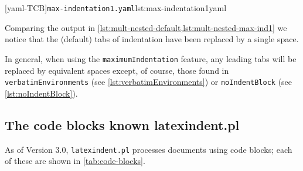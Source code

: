 	\begin{cmhtcbraster}
		[yaml-TCB]{\texttt{max-indentation1.yaml}}{lst:max-indentation1yaml}
	\end{cmhtcbraster}

	Comparing the output in \cref{lst:mult-nested-default,lst:mult-nested-max-ind1} we notice
	that the (default) tabs of indentation have been replaced by a single space.

	In general, when using the \texttt{maximumIndentation} feature, any leading tabs will be
	replaced by equivalent spaces except, of course, those found in
	\texttt{verbatimEnvironments} (see \vref{lst:verbatimEnvironments}) or
	\texttt{noIndentBlock} (see \vref{lst:noIndentBlock}).

\subsection{The code blocks known latexindent.pl}\label{subsubsec:code-blocks}

	As of Version 3.0, \texttt{latexindent.pl} processes documents using code blocks; each of
	these are shown in \cref{tab:code-blocks}.

